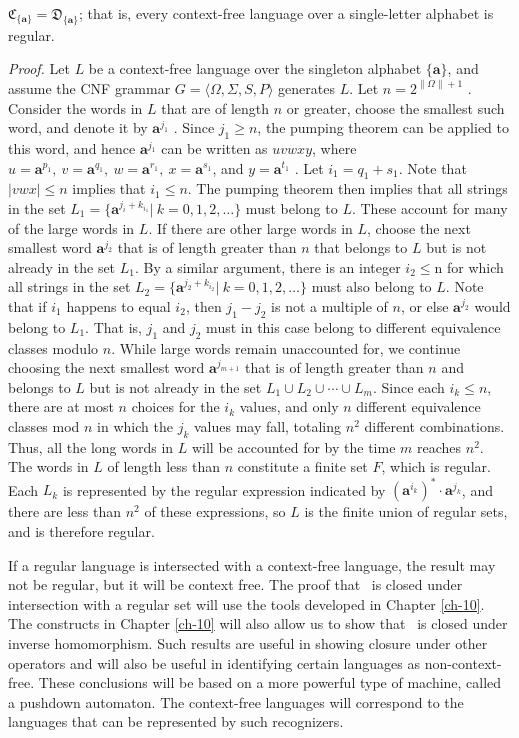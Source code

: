 \begin{thm}\label{thm-9.15}
$\mathfrak{C}_{\{\pmb{a}\}} = \mathfrak{D}_{\{\pmb{a}\}}$; that is, every
context-free language over a single-letter alphabet is regular.

\emph{Proof.} Let $L$ be a context-free language over the singleton alphabet
$\{\pmb{a}\}$, and assume the CNF grammar $G=\langle\Omega,\Sigma,S,P\rangle$
generates $L$. Let $n = 2^{\|\Omega\|+1}$ . Consider the words in $L$ that are of
length $n$ or greater, choose the smallest such word, and denote it by
$\pmb{a}^{j_1}$ . Since $j_1 \geq n$, the pumping theorem can be applied to this
word, and hence $\pmb{a}^{j_1}$ can be written as $uvwxy$, where $u=\pmb{a}^{p_1},\ 
v=\pmb{a}^{q_1},\ w=\pmb{a}^{r_1},\ x=\pmb{a}^{s_1}$, and $y=\pmb{a}^{t_1}$ . Let
$i_1=q_1+s_1$. Note that $|vwx|\leq n$ implies that $i_1 \leq n$. The pumping
theorem then implies that all strings in the set $L_1=\{\pmb{a}^{j_i+k_{i_1}}|\ k=0,1,
2,\ldots\}$ must belong to $L$. These account for many of the large words in $L$.
If there are other large words in $L$, choose the next smallest word $\pmb{a}^{
j_2}$ that is of length greater than $n$ that belongs to $L$ but is not already
in the set $L_1$. By a similar argument, there is an integer $i_2 \leq $n for
which all strings in the set $L_2=\{\pmb{a}^{j_2+k_{i_2}}|\ k=0,1,2,\ldots\}$ must also
belong to $L$. Note that if $i_1$ happens to equal $i_2$, then $j_1-j_2$ is not
a multiple of $n$, or else $\pmb{a}^{j_2}$ would belong to $L_1$. That is, $j_1$
and $j_2$ must in this case belong to different equivalence classes modulo $n$.
While large words remain unaccounted for, we continue choosing the next smallest
word $\pmb{a}^{j_{m+1}}$ that is of length greater than $n$ and belongs to $L$
but is not already in the set $L_1\cup L_2\cup\cdots\cup L_m$. Since each $i_k
\leq n$, there are at most $n$ choices for the $i_k$ values, and only $n$ different
equivalence classes mod $n$ in which the $j_k$ values may fall, totaling $n^2$
different combinations. Thus, all the long words in $L$ will be accounted for by
the time $m$ reaches $n^2$. The words in $L$ of length less than $n$ constitute
a finite set $F$, which is regular. Each $L_k$ is represented by the regular
expression indicated by $(\pmb{a}^{i_k})^*\cdot\pmb{a}^{j_k}$, and there are less
than $n^2$ of these expressions, so $L$ is the finite union of regular sets, and
is therefore regular.
\end{thm}

If a regular language is intersected with a context-free language, the result
may not be regular, but it will be context free. The proof that \CSIG\ is
closed under intersection with a regular set will use the tools developed in
Chapter \ref{ch-10}. The constructs in Chapter \ref{ch-10} will also allow us to show that \CSIG\ 
is closed under inverse homomorphism. Such results are useful in showing closure
under other operators and will also be useful in identifying certain languages
as non-context-free. These conclusions will be based on a more powerful type of
machine, called a pushdown automaton. The context-free languages will correspond
to the languages that can be represented by such recognizers.

